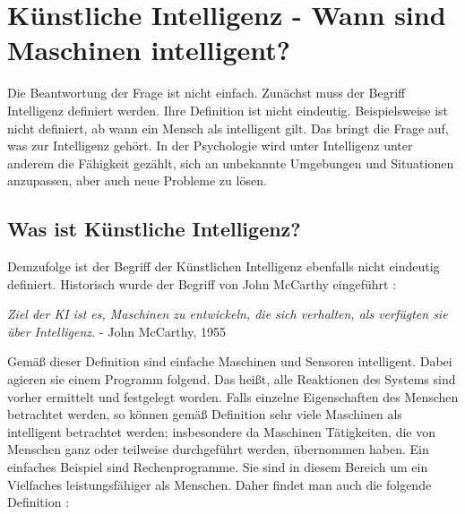 %
%

% 





\chapter{Künstliche Intelligenz - Wann sind Maschinen intelligent?}

Die Beantwortung der Frage ist nicht einfach. Zunächst muss der Begriff Intelligenz definiert werden. Ihre Definition ist nicht eindeutig.  Beispielsweise ist nicht definiert, ab wann ein Mensch als intelligent gilt. Das bringt die Frage auf, was zur Intelligenz gehört. In der Psychologie wird unter Intelligenz unter anderem die Fähigkeit gezählt, sich an unbekannte Umgebungen und Situationen anzupassen, aber auch neue Probleme zu lösen.\cite{Funke:1998}


\section{Was ist Künstliche Intelligenz?}

Demzufolge ist der Begriff der Künstlichen Intelligenz ebenfalls nicht eindeutig definiert. Historisch wurde der Begriff von John McCarthy eingeführt  \cite{McCarthy:2006}:

\bigskip

\textsl{\glqq Ziel der KI ist es, Maschinen zu entwickeln, die sich verhalten, als verfügten sie über Intelligenz.\grqq{}} - John McCarthy, 1955
	
\bigskip

Gemäß dieser Definition sind einfache Maschinen und Sensoren intelligent. Dabei agieren sie einem Programm folgend. Das heißt, alle Reaktionen des Systems sind vorher ermittelt und festgelegt worden. Falls einzelne Eigenschaften des Menschen betrachtet werden, so können gemäß Definition sehr viele Maschinen als intelligent betrachtet werden; insbesondere da Maschinen Tätigkeiten, die von Menschen ganz oder teilweise durchgeführt werden, übernommen haben. Ein einfaches Beispiel sind Rechenprogramme. Sie sind in diesem Bereich um ein Vielfaches leistungsfähiger als Menschen. Daher findet man auch die folgende Definition \cite{Rich:1983}:


